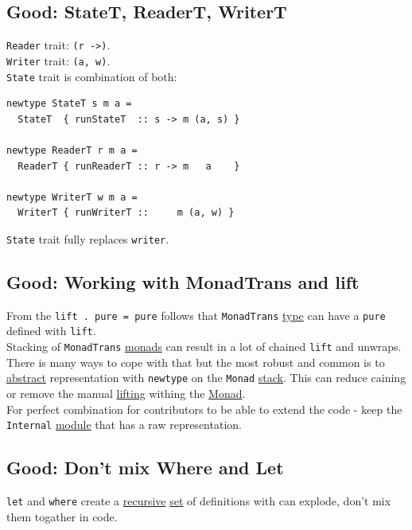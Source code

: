 \documentclass[11pt]{article}
\begin{document}
\subsection{\label{org9df9d78}Good: StateT, ReaderT, WriterT}
\label{sec:org85e8ccc}
\texttt{Reader} trait: \texttt{(r ->)}.\\

\texttt{Writer} trait: \texttt{(a, w)}.\\

\texttt{State} trait is combination of both:\\
\begin{verbatim}
newtype StateT s m a =
  StateT  { runStateT  :: s -> m (a, s) }

newtype ReaderT r m a =
  ReaderT { runReaderT :: r -> m   a    }

newtype WriterT w m a =
  WriterT { runWriterT ::     m (a, w) }
\end{verbatim}

\texttt{State} trait fully replaces \texttt{writer}.\\

\subsection{\label{org5a88597}Good: Working with MonadTrans and lift}
\label{sec:org878a2f5}
From the \texttt{lift . pure = pure} follows that \texttt{MonadTrans} \hyperref[org4fbaeb8]{type} can have a \texttt{pure} defined with \texttt{lift}.\\

Stacking of \texttt{MonadTrans} \hyperref[org3ecde32]{monads} can result in a lot of chained \texttt{lift} and unwraps. There is many ways to cope with that but the most robust and common is to \hyperref[org606d002]{abstract} representation with \texttt{newtype} on the \texttt{Monad} \hyperref[org901a5a9]{stack}. This can reduce caining or remove the manual \hyperref[org1674a1b]{lifting} withing the \hyperref[org268aaf1]{Monad}.\\
For perfect combination for contributors to be able to extend the code - keep the \texttt{Internal} \hyperref[orgde475c6]{module} that has a raw representation.\\

\subsection{\label{orgf5b758d}Good: Don't mix Where and Let}
\label{sec:org8d46808}
\texttt{let} and \texttt{where} create a \hyperref[org06bac4d]{recursive} \hyperref[orgbed80ba]{set} of definitions with can explode, don't mix them togather in code.\\
\end{document}
